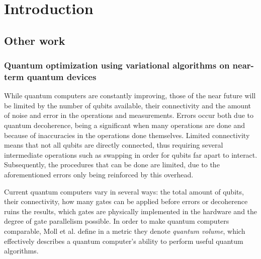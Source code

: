 \chapter{Introduction}

\section{Other work}

\subsection{Quantum optimization using variational algorithms on near-term quantum devices}
While quantum computers are constantly improving, those of the near future will be limited by the number of qubits available, their connectivity and the amount of noise and error in the operations and measurements. Errors occur both due to quantum decoherence, being a significant when many operations are done and because of inaccuracies in the operations done themselves. Limited connectivity means that not all qubits are directly connected, thus requiring several intermediate operations such as swapping in order for qubits far apart to interact. Subsequently, the procedures that can be done are limited, due to the aforementioned errors only being reinforced by  this overhead.

Current quantum computers vary in several ways: the total amount of qubits, their connectivity, how many gates can be applied before errors or decoherence ruins the results, which gates are physically implemented in the hardware and the degree of gate parallelism possible. In order to make quantum computers comparable, Moll et al. define in \cite{moll2018} a metric they denote \textit{quantum volume}, which effectively describes a quantum computer's ability to perform useful quantum algorithms.